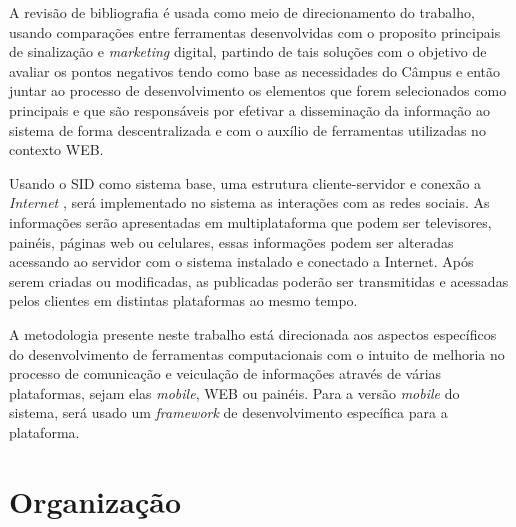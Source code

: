 A revisão de bibliografia é usada como meio de direcionamento do trabalho, usando comparações entre ferramentas desenvolvidas com o proposito principais de sinalização e \textit{marketing} digital, partindo de tais soluções com o objetivo de avaliar os pontos negativos tendo como base as necessidades do Câmpus e então juntar ao processo de desenvolvimento os elementos que forem selecionados como principais e que são responsáveis por efetivar a disseminação da informação ao sistema de forma descentralizada e com o auxílio de ferramentas utilizadas no contexto WEB.
	 
Usando o SID como sistema base, uma estrutura cliente-servidor e conexão a \textit{Internet} , será implementado no sistema as interações com as redes sociais. As informações serão apresentadas em multiplataforma que podem ser televisores, painéis, páginas web ou celulares, essas informações podem ser alteradas acessando ao servidor com o sistema instalado e conectado a Internet. Após serem criadas ou modificadas, as publicadas poderão ser transmitidas e acessadas pelos clientes em distintas plataformas ao mesmo tempo.

A metodologia presente neste trabalho está direcionada aos aspectos específicos do desenvolvimento de ferramentas computacionais com o intuito de melhoria no processo de comunicação e veiculação de informações através de várias plataformas, sejam elas \textit{mobile}, WEB ou painéis. Para a versão \textit{mobile} do sistema, será usado um \textit{framework} de desenvolvimento específica para a plataforma.

\section{Organização}
